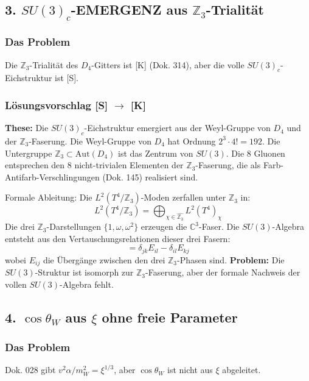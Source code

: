 \documentclass[11pt,a4paper]{article}
\begin{document}
	\subsection{3. \texorpdfstring{$SU(3)_c$}{SU(3)\_c}-EMERGENZ aus \texorpdfstring{$\mathbb{Z}_3$}{Z3}-Trialität}
	\subsubsection{Das Problem}
	Die $\mathbb{Z}_3$-Trialität des $D_4$-Gitters ist [K] (Dok. 314), aber die volle $SU(3)_c$-Eichstruktur ist [S].
	
	\subsubsection{Lösungsvorschlag [S] \texorpdfstring{$\rightarrow$}{->} [K]}
	\textbf{These:} Die $SU(3)_c$-Eichstruktur emergiert aus der Weyl-Gruppe von $D_4$ und der $\mathbb{Z}_3$-Faserung.
	Die Weyl-Gruppe von $D_4$ hat Ordnung $2^3 \cdot 4! = 192$. Die Untergruppe $\mathbb{Z}_3 \subset \text{Aut}(D_4)$ ist das Zentrum von $SU(3)$.
	Die 8 Gluonen entsprechen den 8 nicht-trivialen Elementen der $\mathbb{Z}_3$-Faserung, die als Farb-Antifarb-Verschlingungen (Dok. 145) realisiert sind.
	
	Formale Ableitung: Die $L^2(T^4/\mathbb{Z}_3)$-Moden zerfallen unter $\mathbb{Z}_3$ in:
	\begin{equation}
		L^2(T^4/\mathbb{Z}_3) = \bigoplus_{\chi \in \widehat{\mathbb{Z}_3}} L^2(T^4)_\chi
	\end{equation}
	Die drei $\mathbb{Z}_3$-Darstellungen $\{1, \omega, \omega^2\}$ erzeugen die $\mathbb{C}^3$-Faser. Die $SU(3)$-Algebra entsteht aus den Vertauschungsrelationen dieser drei Fasern:
	\begin{equation}
		[E_{ij}, E_{kl}] = \delta_{jk}E_{il} - \delta_{il}E_{kj}
	\end{equation}
	wobei $E_{ij}$ die Übergänge zwischen den drei $\mathbb{Z}_3$-Phasen sind.
	\textbf{Problem:} Die $SU(3)$-Struktur ist isomorph zur $\mathbb{Z}_3$-Faserung, aber der formale Nachweis der vollen $SU(3)$-Algebra fehlt.
	
	\subsection{4. \texorpdfstring{$\cos\theta_W$}{cos theta\_W} aus \texorpdfstring{$\xi$}{xi} ohne freie Parameter}
	\subsubsection{Das Problem}
	Dok. 028 gibt $v^2 \alpha / m_W^2 = \xi^{1/3}$, aber $\cos\theta_W$ ist nicht aus $\xi$ abgeleitet.
	
\end{document}
